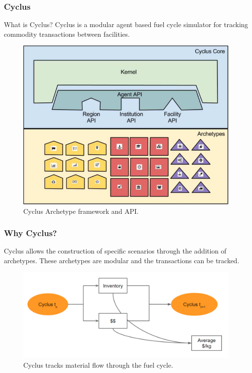 \begin{frame}
	\frametitle{Cyclus}
    \begin{block}{What is Cyclus?}
    	Cyclus is a modular agent based fuel cycle simulator for tracking commodity transactions
    	between facilities.
    \end{block}
	\begin{figure}
		\centering
		\includegraphics[width=0.6\linewidth]{Cyclus_graph}
		\caption{Cyclus Archetype framework and API.}
	\end{figure}
\end{frame}

\begin{frame}
\frametitle{Why Cyclus?}
	Cyclus allows the construction of specific scenarios through the addition of archetypes. These archetypes are
	modular and the transactions can be tracked.
	\begin{figure}
		\centering
		\includegraphics[width=0.9\linewidth]{cyclus-material-track}
		\caption{Cyclus tracks material flow through the fuel cycle.}
		\label{fig:tracking}
	\end{figure}
\end{frame}

